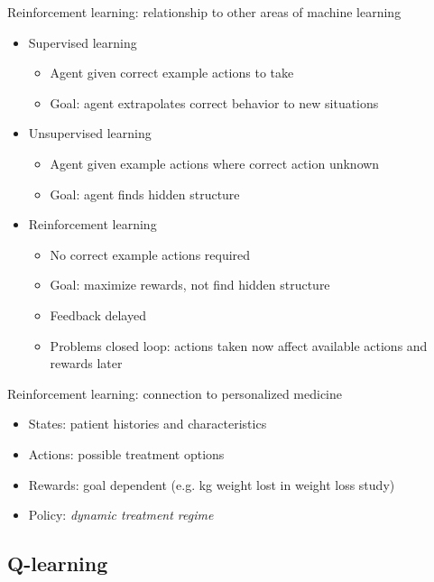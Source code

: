 \documentclass{beamer}
\begin{document}
\begin{frame}[c]{Reinforcement learning: relationship to other areas of machine learning}
\begin{itemize}[<+->]
  \item Supervised learning
  \begin{itemize}
    \item Agent given correct example actions to take
    \item Goal: agent extrapolates correct behavior to new situations
  \end{itemize}
  \item Unsupervised learning
  \begin{itemize}
    \item Agent given example actions where correct action unknown
    \item Goal: agent finds hidden structure
  \end{itemize} 
  \item Reinforcement learning
\begin{itemize}
  \item No correct example actions required
  \item Goal: maximize rewards, not find hidden structure
  \item Feedback delayed 
  \item Problems closed loop: actions taken now affect available actions and rewards later
\end{itemize} 
\end{itemize}
\end{frame}


\begin{frame}[c]{Reinforcement learning: connection to personalized medicine}
  
  \begin{itemize}[<+->]
      \item States: patient histories and characteristics
      \item Actions: possible treatment options
      \item Rewards: goal dependent (e.g. kg weight lost in weight loss study)
      \item Policy: \emph{dynamic treatment regime} 
  \end{itemize}

\end{frame}

\subsection{Q-learning} %
\label{sub:q_learning}
\end{document}
